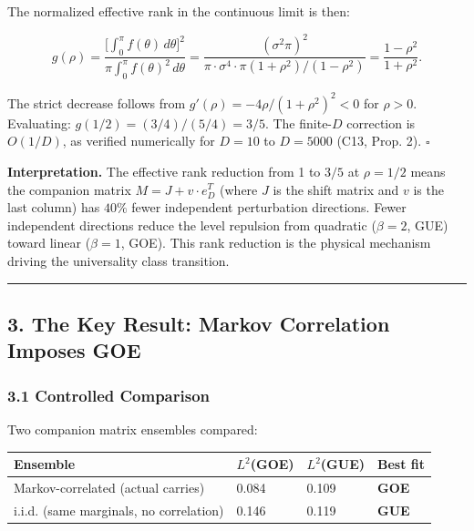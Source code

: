 \documentclass[
  11pt,
]{article}
\begin{document}
The normalized effective rank in the continuous limit is then:

\[g(\rho) = \frac{\bigl[\int_0^\pi f(\theta)\,d\theta\bigr]^2}{\pi\int_0^\pi f(\theta)^2\,d\theta} = \frac{(\sigma^2\pi)^2}{\pi \cdot \sigma^4 \cdot \pi(1+\rho^2)/(1-\rho^2)} = \frac{1-\rho^2}{1+\rho^2}.\]

The strict decrease follows from \(g'(\rho) = -4\rho/(1+\rho^2)^2 < 0\) for
\(\rho > 0\). Evaluating: \(g(1/2) = (3/4)/(5/4) = 3/5\). The finite-\(D\)
correction is \(O(1/D)\), as verified numerically for \(D = 10\) to \(D = 5000\)
(C13, Prop. 2). \(\square\)

\textbf{Interpretation.} The effective rank reduction from 1 to \(3/5\) at
\(\rho = 1/2\) means the companion matrix \(M = J + v \cdot e_D^T\) (where \(J\)
is the shift matrix and \(v\) is the last column) has \(40\%\) fewer independent
perturbation directions. Fewer independent directions reduce the level repulsion
from quadratic (\(\beta = 2\), GUE) toward linear (\(\beta = 1\), GOE). This
rank reduction is the physical mechanism driving the universality class
transition.

\begin{center}\rule{0.5\linewidth}{0.5pt}\end{center}

\newpage

\subsection{3. The Key Result: Markov Correlation Imposes
GOE}\label{the-key-result-markov-correlation-imposes-goe}

\subsubsection{3.1 Controlled Comparison}\label{controlled-comparison}

Two companion matrix ensembles compared:

\begin{longtable}[]{@{}llll@{}}
\toprule\noalign{}
Ensemble & \(L^2\)(GOE) & \(L^2\)(GUE) & Best fit \\
\midrule\noalign{}
\endhead
\bottomrule\noalign{}
\endlastfoot
Markov-correlated (actual carries) & 0.084 & 0.109 & \textbf{GOE} \\
i.i.d. (same marginals, no correlation) & 0.146 & 0.119 & \textbf{GUE} \\
\end{longtable}
\end{document}
